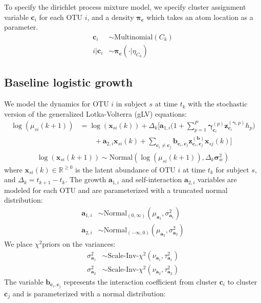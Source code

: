 \documentclass{article}
\newcommand{\Normaldist}{\text{Normal}}
\newcommand{\ScaledInvChiSquaredTdist}{\text{Scale-Inv-}$\chi^2$} %
\newcommand{\ScaledInvChiSquareddist}{\text{Scale-Inv-}\chi^2}
\newcommand{\Multinomialdist}{\text{Multinomial}}
\newcommand{\ci}[1]{\mathbf{c}_{#1}}
\newcommand{\probc}{\mathbf{\pi_{\mathbf{c}}}}
\newcommand{\growth}{\mathbf{a}_1}
\newcommand{\growthi}[1]{\mathbf{a}_{1,#1}}
\newcommand{\meangrowth}{\mu_{\growth}}
\newcommand{\vargrowth}{\sigma^2_{\growth}}
\newcommand{\dofgrowth}{\nu_{\growth}}
\newcommand{\scalegrowth}{\tau^2_{\growth}}
\newcommand{\si}{\mathbf{a}_2}
\newcommand{\sii}[1]{\mathbf{a}_{2,#1}}
\newcommand{\meansi}{\mu_{\si}}
\newcommand{\varsi}{\sigma^2_{\si}}
\newcommand{\dofsi}{\nu_{\si}}
\newcommand{\scalesi}{\tau^2_{\si}}
\newcommand{\interact}{\mathbf{b}}
\newcommand{\interactcij}[2]{\interact_{\ci{#1}, \ci{#2}}}
\newcommand{\zinteractcij}[2]{\mathbf{z}^{(\interact)}_{\ci{#1}, \ci{#2}}}
\newcommand{\pert}{\mathbf{\gamma}}
\newcommand{\pertic}[2]{\mathbf{\gamma}^{(#1)}_{\ci{#2}}} %
\newcommand{\zpertic}[2]{\mathbf{z}^{(\pert, #1)}_{\ci{#2}}}
\newcommand{\stepperti}[1]{h_{#1}}
\newcommand{\pv}{\mathbf{\sigma}_w^2}
\newcommand{\musik}[3]{\mu_{#1 #2}(#3)}
\newcommand{\xsik}[3]{\mathbf{x}_{#1 #2}(#3)}
\newcommand{\dt}{\Delta_k}
\newcommand{\reals}{\mathbb{R}} %
\begin{document}
To specify the dirichlet process mixture model, we specify cluster assignment variable $\ci{i}$ for each OTU $i$, and a density $\probc$ which takes an atom location as a parameter.
\begin{align}
    \ci{i} & \sim \Multinomialdist (C_k) \\
    i | \ci{i} & \sim \probc( \cdot | \eta_{C_k})
\end{align}

\subsection{Baseline logistic growth}
We model the dynamics for OTU $i$ in subject $s$ at time $t_k$ with the stochastic version of the generalized Lotka-Volterra (gLV) equations:
\begin{align}
    \label{eqn: logistic growth}
    \log (\musik{s}{i}{k+1} ) & = 
        \log ( \xsik{s}{i}{k} ) + 
        \dt \Big[
            \growthi{i} \Big(
                1 + \sum_{p=1}^P \pertic{p}{i} \zpertic{p}{i} \stepperti{p}
            \Big) \\
            & \quad \quad + \sii{i} \xsik{s}{i}{k}  + 
            \sum_{\ci{i} \neq \ci{j}} 
                \interactcij{i}{j}
                \zinteractcij{i}{j}
                \xsik{s}{j}{k} \nonumber
        \Big]
\end{align}
\begin{align}
    \log ( \xsik{s}{i}{k+1} ) \sim \Normaldist ( \log ( \musik{s}{i}{k+1} ) , \dt \pv)
\end{align}
where $\xsik{s}{i}{k} \in \reals^{\ge 0}$ is the latent abundance of OTU $i$ at time $t_k$ for subject $s$, and $\dt = t_{k+1} - t_k$. The growth $\growthi{i}$ and self-interaction $\sii{i}$ variables are modeled for each OTU and are parameterized with a truncated normal distribution:
\begin{align}
    \growthi{i} & \sim \Normaldist_{(0, \infty)} ( \meangrowth , \vargrowth ) \\
    \sii{i} & \sim \Normaldist_{(-\infty , 0)} ( \meansi , \varsi )
\end{align}
We place \ScaledInvChiSquaredTdist priors on the variances:
\begin{align}
    \vargrowth & \sim \ScaledInvChiSquareddist (\dofgrowth, \scalegrowth) \\
    \varsi & \sim \ScaledInvChiSquareddist (\dofsi, \scalesi)
\end{align}
The variable $\interactcij{i}{j}$ represents the interaction coefficient from cluster $\ci{i}$ to cluster $\ci{j}$ and is parameterized with a normal distribution:
\end{document}
